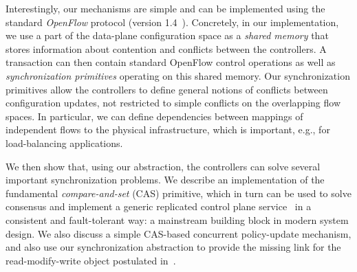 \documentclass[conference]{sigcomm-alternate}
\newcommand{\petr}[1]{\textit{\textcolor{blue}{[petr]: #1}}} %
\begin{document}
Interestingly, our mechanisms are simple and can be implemented using the standard \emph{OpenFlow}
protocol (version 1.4~\cite{openflow}). 
%
%
Concretely, in our implementation, 
we use a part of the data-plane configuration space as a \emph{shared
  memory}  that stores information about  contention and conflicts
between the controllers.
A transaction can then contain standard OpenFlow control operations
as well as  \emph{synchronization primitives} operating on this shared
memory.
Our synchronization primitives allow the controllers to define
general notions of conflicts between configuration updates, 
not restricted to simple conflicts on the overlapping flow spaces.
In particular, we can define dependencies between mappings of
independent flows to the physical infrastructure, which is important,
e.g., for load-balancing applications.     


We then show that, using our abstraction, the controllers can
solve several important synchronization problems.
We describe an implementation of the fundamental
\emph{compare-and-set} (CAS) primitive,
which in turn can be used to solve consensus and
implement a generic replicated control plane service~\cite{Her91} in a consistent and
fault-tolerant way: a mainstream building block in
modern system design.
We also discuss a simple CAS-based concurrent policy-update mechanism,
and also use our synchronization abstraction to provide
the missing link for the read-modify-write object
postulated in~\cite{stn}. %
\end{document}
